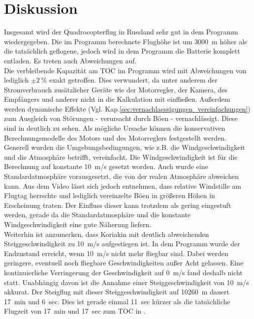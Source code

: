 \section{Diskussion}
\label{sec:nachbildung_diskussion}
Insgesamt wird der Quadrocopterflug in Russland sehr gut in dem Programm wiedergegeben. Die im Programm berechnete Flughöhe ist um \SI{3000}{m} höher als die tatsächlich geflogene, jedoch wird in dem Programm die Batterie komplett entladen. Es treten auch Abweichungen auf.\\
Die verbleibende Kapazität am TOC im Programm wird mit Abweichungen von lediglich \ensuremath{\pm\SI{2}{\%}} exakt getroffen. Dies verwundert, da unter anderem der Stromverbrauch zusätzlicher Geräte wie der Motorregler, der Kamera, des Empfängers und anderer nicht in die Kalkulation mit einfließen. Außerdem werden dynamische Effekte (Vgl. Kap.\ref{sec:vernachlaessigungen_vereinfachungen}) zum Ausgleich von Störungen - verursacht durch Böen - vernachlässigt. Diese sind in \cite{Anderson.2018} deutlich zu sehen. Als mögliche Ursache können die konservativen Berechnungsmodelle des Motors und des Motorreglers festgestellt werden. Generell wurden die Umgebungsbedingungen, wie z.B. die Windgeschwindigkeit und die Atmosphäre betrifft, vereinfacht. Die Windgeschwindigkeit ist für die Berechnung auf konstante \SI{10}{m/s} gesetzt worden. Auch wurde eine Standardatmosphäre vorausgesetzt, die von der realen Atmosphäre abweichen kann. Aus dem Video lässt sich jedoch entnehmen, dass relative Windstille am Flugtag herrschte und lediglich vereinzelte Böen in größeren Höhen in Erscheinung traten. Der Einfluss dieser kann trotzdem als gering eingestuft werden, gerade da die Standardatmosphäre und die konstante Windgeschwindigkeit eine gute Näherung liefern. \\
Weiterhin ist anzumerken, dass Koriakin mit deutlich abweichenden Steiggeschwindigkeit zu \SI{10}{m/s} aufgestiegen ist. In dem Programm wurde der Endzustand erreicht, wenn \SI{10}{m/s} nicht mehr fliegbar sind. Dabei werden geringere, eventuell noch fliegbare Geschwindigkeiten außer Acht gelassen. Eine kontinuierliche Verringerung der Geschwindigkeit auf \SI{0}{m/s} fand deshalb nicht statt. Unabhängig davon ist die Annahme einer Steiggeschwindigkeit von \SI{10}{m/s} akkurat. Der Steigflug mit dieser Steiggeschwindigkeit auf \SI{10260}{m} dauert \SI{17}{min} und \SI{6}{sec}. Dies ist gerade einmal \SI{11}{sec} kürzer als die tatsächliche Flugzeit von \SI{17}{min} und \SI{17}{sec} zum TOC in \cite{Anderson.2018}.\\
